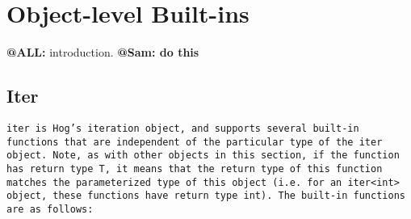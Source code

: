 \documentclass{book}
\begin{document}

\section{Object-level Built-ins} %
\label{sec:object_level_built_ins}

\textbf{@ALL:} introduction. \textbf{@Sam: do this}

\subsection{Iter} %
\label{sub:iter}

\tt iter \rm is Hog's iteration object, and supports several built-in functions
that are independent of the particular type of the \tt iter \rm object. Note, 
as with other objects in this section, if the function has return type T, it 
means that the return type of this function matches the parameterized type of
this object (i.e. for an \tt iter<int> \rm object, these functions have return
type \tt int\rm). The built-in functions are as follows:
\end{document}
